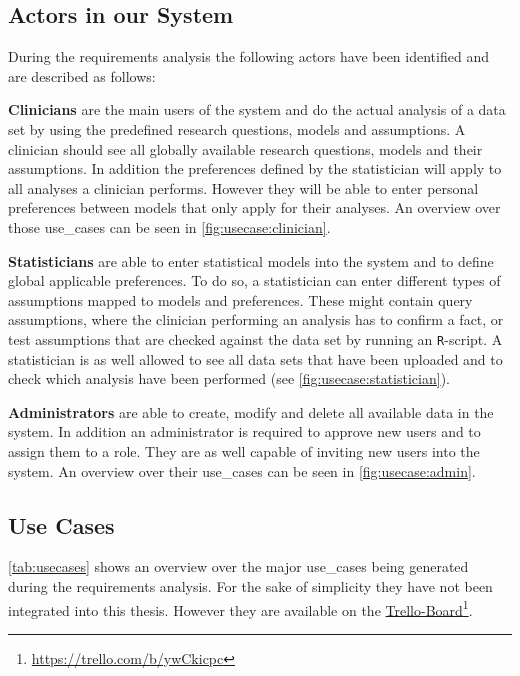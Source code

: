 \subsection{Actors in our System}
\label{sub:sassoon:actors}
During the requirements analysis the following actors have been identified and are described as follows:

\textbf{Clinicians} are the main users of the system and do the actual analysis of a data set by using the predefined research questions, models and assumptions. A clinician should see all globally available research questions, models and their assumptions. In addition the preferences defined by the statistician will apply to all analyses a clinician performs. However they will be able to enter personal preferences between models that only apply for their analyses. An overview over those \glspl{use_case} can be seen in \autoref{fig:usecase:clinician}.

\textbf{Statisticians} are able to enter statistical models into the system and to define global applicable preferences. To do so, a statistician can enter different types of assumptions mapped to models and preferences. These might contain query assumptions, where the clinician performing an analysis has to confirm a fact, or test assumptions that are checked against the data set by running an \texttt{R}-script. A statistician is as well allowed to see all data sets that have been uploaded and to check which analysis have been performed (see \autoref{fig:usecase:statistician}).



\textbf{Administrators} are able to create, modify and delete all available data in the system. In addition an administrator is required to approve new users and to assign them to a role. They are as well capable of inviting new users into the system. An overview over their \glspl{use_case} can be seen in \autoref{fig:usecase:admin}.





\subsection{Use Cases}
\label{sub:use_cases}
\autoref{tab:usecases} shows an overview over the major \glspl{use_case} being generated during the requirements analysis. For the sake of simplicity they have not been integrated into this thesis. However they are available on the \href{https://trello.com/b/ywCkicpc}{Trello-Board}\footnote{\url{https://trello.com/b/ywCkicpc}}.

